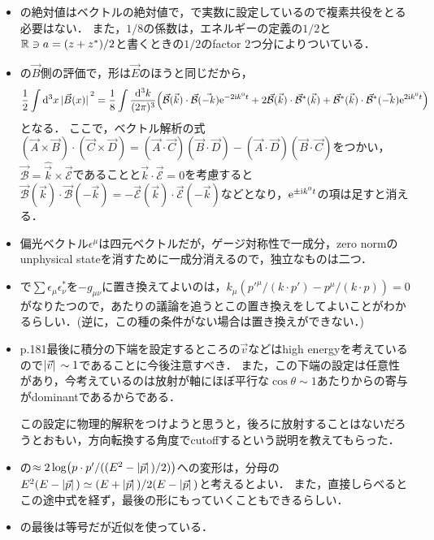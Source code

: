 \begin{itemize}
	\item {}の絶対値はベクトルの絶対値で，で実数に設定しているので複素共役をとる必要はない．
	また，$1/8$の係数は，エネルギーの定義の$1/2$と$\mathbb{R}\ni a = (z+z^*)/2$と書くときの$1/2$のfactor 2つ分によりついている．

	\item {}の$\vec{B}$側の評価で，形は$\vec{E}$のほうと同じだから，
	\begin{equation}
		\frac{1}{2}\int\dd[3]{x}\abs*{\vec{B}(x)}^2
		= \frac{1}{8}\int \frac{\dd[3]{k}}{(2\pi)^{3}}
		\qty(\vec{\mathcal{B}}(\vec{k})\cdot \vec{\mathcal{B}}(\vec{-k})\mathrm{e}^{-2\mathrm{i} k^0t}
		+ 2\vec{\mathcal{B}}(\vec{k}) \cdot \vec{\mathcal{B}}^{*}(\vec{k})
		+ \vec{\mathcal{B}}^{*}(\vec{k}) \cdot \vec{\mathcal{B}}^{*}(\vec{-k})\mathrm{e}^{2\mathrm{i} k^0t})
	\end{equation} 
	となる．
	ここで，ベクトル解析の式$(\vec{A}\times\vec{B})\cdot(\vec{C}\times \vec{D}) = (\vec{A}\cdot \vec{C})(\vec{B}\cdot \vec{D}) - (\vec{A}\cdot\vec{D})(\vec{B}\cdot \vec{C})$をつかい，$\vec{\mathcal{B}} = \hat{\vec{k}} \times \vec{\mathcal{E}}$であることと$\vec{k} \cdot \vec{\mathcal{E}} = 0$を考慮すると$\vec{\mathcal{B}}(\vec{k})\cdot\vec{\mathcal{B}}(-\vec{k}) = -\vec{\mathcal{E}}(\vec{k})\cdot\vec{\mathcal{E}}(-\vec{k})$などとなり，$\mathrm{e}^{\pm \mathrm{i} k^0t}$の項は足すと消える．

	\item 偏光ベクトル$\epsilon^{\mu}$は四元ベクトルだが，ゲージ対称性で一成分，zero normのunphysical stateを消すために一成分消えるので，独立なものは二つ．
	\item {}で$\sum \epsilon_\mu\epsilon_\nu^{*}$を$-g_{\mu\nu}$に置き換えてよいのは，$k_{\mu}(p'^{\mu}/(k\cdot p') - p^{\mu}/(k\cdot p)) = 0$がなりたつので，あたりの議論を追うとこの置き換えをしてよいことがわかるらしい．(逆に，この種の条件がない場合は置き換えができない．)
	

	\item p.181最後に積分の下端を設定するところの$\vec{v}$などはhigh energyを考えているので$\abs*{\vec{v}} \sim 1$であることに今後注意すべき．
	また，この下端の設定は任意性があり，今考えているのは放射が軸にほぼ平行な$\cos\theta \sim 1$あたりからの寄与がdominantであるからである．

	この設定に物理的解釈をつけようと思うと，後ろに放射することはないだろうとおもい，方向転換する角度でcutoffするという説明を教えてもらった．


	\item {}の$\approx 2\log(p\cdot p'/((E^2-\abs*{\vec{p}})/2))$への変形は，分母の$E^2(E-\abs*{\vec{p}}) \simeq (E+\abs*{\vec{p}})/2(E-\abs*{\vec{p}})$と考えるとよい．
	また，直接しらべるとこの途中式を経ず，最後の形にもっていくこともできるらしい． 
	\item {}の最後は等号だが近似を使っている．
\end{itemize}
